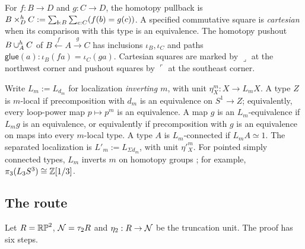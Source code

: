 For $f:B\to D$ and $g:C\to D$, the homotopy pullback is $B\mathbin{\times}^{h}_DC:=\sum_{b:B}\sum_{c:C}(f(b)=g(c))$. A specified commutative square is \emph{cartesian} when its comparison with this type is an equivalence. The homotopy pushout $B\mathbin{\cup}^{h}_AC$ of $B\xleftarrow{f}A\xrightarrow{g}C$ has inclusions $\iota_B,\iota_C$ and paths $\mathsf{glue}(a):\iota_B(fa)=\iota_C(ga)$. Cartesian squares are marked by $\lrcorner$ at the northwest corner and pushout squares by $\ulcorner$ at the southeast corner.

Write $L_m:=L_{d_m}$ for localization \emph{inverting $m$}, with unit $\eta^m_X:X\to L_mX$. A type $Z$ is $m$-local if precomposition with $d_m$ is an equivalence on $S^1\to Z$; equivalently, every loop-power map $p\mapsto p^m$ is an equivalence. A map $g$ is an $L_m$-equivalence if $L_mg$ is an equivalence, or equivalently if precomposition with $g$ is an equivalence on maps into every $m$-local type. A type $A$ is $L_m$-connected if $L_mA\simeq1$. The separated localization is $L'_m:=L_{\Sigma d_m}$, with unit $\eta'^m_X$. For pointed simply connected types, $L_m$ inverts $m$ on homotopy groups \cite[Thm.~4.25]{cors}; for example, $\pi_3(L_3S^3)\cong\mathbb Z[1/3]$.

\subsection{The route}
Let $R=\mathbb{RP}^2$, $\mathcal N=\tau_2R$ and $\eta_2:R\to\mathcal N$ be the truncation unit. The proof has six steps.

